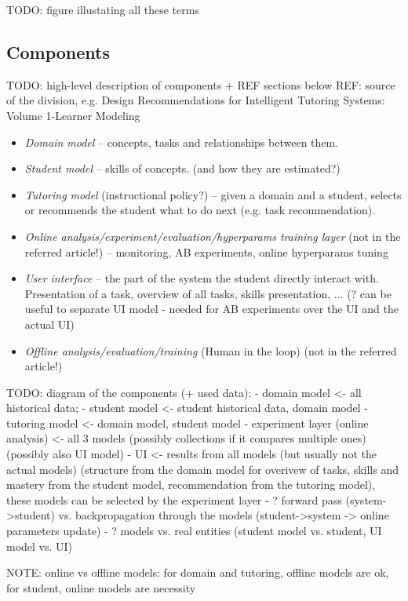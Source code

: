 TODO: figure illustating all these terms

\subsection{Components}

TODO: high-level description of components + REF sections below
REF: source of the division,
e.g. Design Recommendations for Intelligent Tutoring Systems: Volume 1-Learner Modeling

\begin{itemize}
\item \emph{Domain model} -- concepts, tasks and relationships between them.
\item \emph{Student model} -- skills of concepts. (and how they are estimated?)
\item \emph{Tutoring model} (instructional policy?) --
  given a domain and a student, selects or recommends the student what to
    do next (e.g. task recommendation).
\item \emph{Online analysis/experiment/evaluation/hyperparams training layer} (not in the referred article!) -- monitoring, AB experiments, online hyperparams tuning
\item \emph{User interface} -- the part of the system the student directly
  interact with. Presentation of a task, overview of all tasks, skills presentation, ...
  (? can be useful to separate UI model - needed for AB experiments over the UI and the actual UI)
\item \emph{Offline analysis/evaluation/training} (Human in the loop) (not in the referred article!)
\end{itemize}

TODO: diagram of the components (+ used data):
- domain model <- all historical data;
- student model <- student historical data, domain model
- tutoring model <- domain model, student model
- experiment layer (online analysis) <- all 3 models (possibly collections if it compares multiple ones) (possibly also UI model)
- UI <- results from all models (but usually not the actual models) (structure from the domain model for overivew of tasks, skills and mastery from the student model, recommendation from the tutoring model), these models can be selected by the experiment layer
- ? forward pass (system->student) vs. backpropagation through the models (student->system -> online parameters update)
- ? models vs. real entities (student model vs. student, UI model vs. UI)


NOTE: online vs offline models: for domain and tutoring, offline models are ok, for student, online models are necessity


